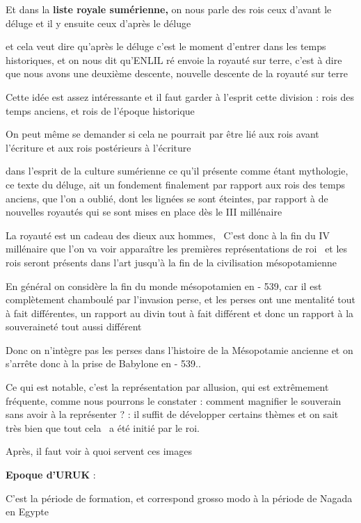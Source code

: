 \documentclass[a4paper]{article}
\begin{document}
Et dans la \textbf{liste royale sumérienne,} on nous parle des rois {\textquotedbl} ceux d'avant le
déluge{\textquotedbl} et il y ensuite ceux {\textquotedbl} d'après le déluge {\textquotedbl}

et cela veut dire qu'après le déluge c'est le moment d'entrer dans les temps historiques, et on nous dit qu'ENLIL ré
envoie la royauté sur terre, c'est à dire que nous avons une deuxième descente, nouvelle descente de la royauté sur
terre




Cette idée est assez intéressante et il faut garder à l'esprit cette division : rois des temps anciens, et rois de
l'époque historique

On peut même se demander si cela ne pourrait par être lié aux rois avant l'écriture et aux rois postérieurs à
l'écriture

dans l'esprit de la culture sumérienne ce qu'il présente comme étant mythologie, ce texte du déluge, ait un fondement
finalement par rapport aux rois des temps anciens, que l'on a oublié, dont les lignées se sont éteintes, par rapport à
de nouvelles royautés qui se sont mises en place dès le III millénaire


La royauté est un cadeau des dieux aux hommes, \ C'est donc à la fin du IV millénaire que l'on va voir apparaître les
premières représentations de roi \ et les rois seront présents dans l'art jusqu'à la fin de la civilisation
mésopotamienne

En général on considère la fin du monde mésopotamien en - 539, car il est complètement chamboulé par l'invasion perse,
et les perses ont une mentalité tout à fait différentes, un rapport au divin tout à fait différent et donc un rapport à
la souveraineté tout aussi différent

Donc on n'intègre pas les perses dans l'histoire de la Mésopotamie ancienne et on s'arrête donc à la prise de Babylone
en - 539..


Ce qui est notable, c'est la représentation par allusion, qui est extrêmement fréquente, comme nous pourrons le
constater : comment magnifier le souverain sans avoir à la représenter ? : il suffit de développer certains thèmes et
on sait très bien que tout cela \ a été initié par le roi. 

Après, il faut voir à quoi servent ces images


\textbf{Epoque d'URUK} : 


C'est la période de formation, et correspond grosso modo à la période de Nagada en Egypte
\end{document}
